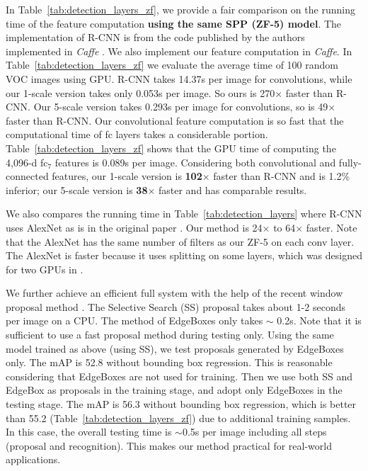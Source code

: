 \documentclass[10pt,journal,cspaper,compsoc]{IEEEtran}
\begin{document}
In Table~\ref{tab:detection_layers_zf}, we provide a fair comparison on the running time of the feature computation \textbf{using the same SPP (ZF-5) model}.
The implementation of R-CNN is from the code published by the authors implemented in \emph{Caffe} \cite{Jia2013}. We also implement our feature computation in \emph{Caffe}. In Table~\ref{tab:detection_layers_zf} we evaluate the average time of 100 random VOC images using GPU.
R-CNN takes 14.37s per image for convolutions, while our 1-scale version takes only 0.053s per image.
So ours is 270$\times$ faster than R-CNN.
Our 5-scale version takes 0.293s per image for convolutions, so is 49$\times$ faster than R-CNN.
Our convolutional feature computation is so fast that the computational time of fc layers takes a considerable portion. Table~\ref{tab:detection_layers_zf} shows that the GPU time of computing the 4,096-d fc$_7$ features is 0.089s per image. Considering both convolutional and fully-connected features, our 1-scale version is \textbf{102$\times$} faster than R-CNN and is 1.2\% inferior; our 5-scale version is \textbf{38$\times$} faster and has comparable results.

We also compares the running time in Table~\ref{tab:detection_layers} where R-CNN uses AlexNet \cite{Krizhevsky2012} as is in the original paper \cite{Girshick2014}. Our method is 24$\times$ to 64$\times$ faster. Note that the AlexNet \cite{Krizhevsky2012} has the same number of filters as our ZF-5 on each conv layer. The AlexNet is faster because it uses splitting on some layers, which was designed for two GPUs in \cite{Krizhevsky2012}.

We further achieve an efficient full system with the help of the recent window proposal method \cite{Zitnick2014}.
The Selective Search (SS) proposal \cite{Sande2011} takes about 1-2 seconds per image on a CPU. The method of EdgeBoxes \cite{Zitnick2014} only takes $\sim$ 0.2s. Note that it is sufficient to use a fast proposal method during testing only.
Using the same model trained as above (using SS), we test proposals generated by EdgeBoxes only. The mAP is 52.8 without bounding box regression. This is reasonable considering that EdgeBoxes are not used for training.
Then we use both SS and EdgeBox as proposals in the training stage, and adopt only EdgeBoxes in the testing stage. The mAP is 56.3 without bounding box regression, which is better than 55.2 (Table~\ref{tab:detection_layers_zf}) due to additional training samples.
In this case, the overall testing time is $\sim$0.5s per image including all steps (proposal and recognition). This makes our method practical for real-world applications.
\end{document}
